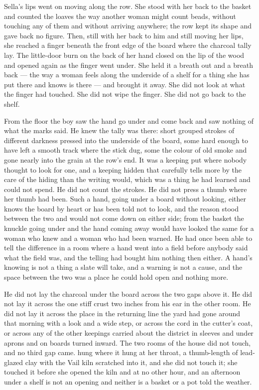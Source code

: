 Sella's lips went on moving along the row. She stood with her back to the basket and counted the loaves the way another woman might count beads, without touching any of them and without arriving anywhere; the row kept its shape and gave back no figure. Then, still with her back to him and still moving her lips, she reached a finger beneath the front edge of the board where the charcoal tally lay. The little-door burn on the back of her hand closed on the lip of the wood and opened again as the finger went under. She held it a breath out and a breath back --- the way a woman feels along the underside of a shelf for a thing she has put there and knows is there --- and brought it away. She did not look at what the finger had touched. She did not wipe the finger. She did not go back to the shelf.

From the floor the boy saw the hand go under and come back and saw nothing of what the marks said. He knew the tally was there: short grouped strokes of different darkness pressed into the underside of the board, some hard enough to have left a smooth track where the stick dug, some the colour of old smoke and gone nearly into the grain at the row's end. It was a keeping put where nobody thought to look for one, and a keeping hidden that carefully tells more by the care of the hiding than the writing would, which was a thing he had learned and could not spend. He did not count the strokes. He did not press a thumb where her thumb had been. Such a hand, going under a board without looking, either knows the board by heart or has been told not to look, and the reason stood between the two and would not come down on either side; from the basket the knuckle going under and the hand coming away would have looked the same for a woman who knew and a woman who had been warned. He had once been able to tell the difference in a room where a hand went into a field before anybody said what the field was, and the telling had bought him nothing then either. A hand's knowing is not a thing a slate will take, and a warning is not a cause, and the space between the two was a place he could hold open and nothing more.

He did not lay the charcoal under the board across the two gaps above it. He did not lay it across the one stiff crust two inches from his ear in the other room. He did not lay it across the place in the returning line the yard had gone around that morning with a look and a wide step, or across the cord in the cutter's coat, or across any of the other keepings carried about the district in sleeves and under aprons and on boards turned inward. The two rooms of the house did not touch, and no third gap came.  hung where it hung at her throat, a thumb-length of lead-glazed clay with the Vail kiln scratched into it, and she did not touch it; she touched it before she opened the kiln and at no other hour, and an afternoon under a shelf is not an opening and neither is a basket or a pot told the weather.

